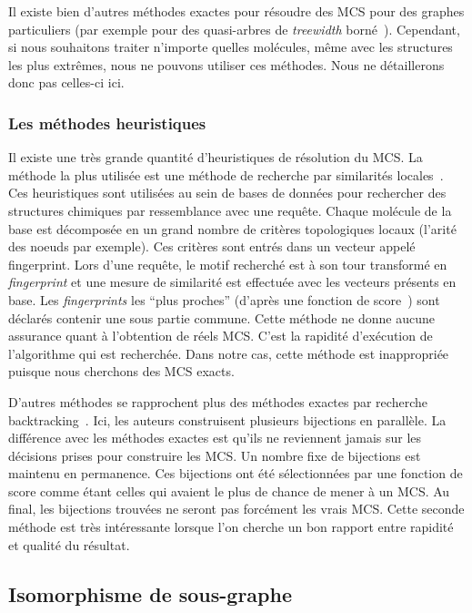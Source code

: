 Il existe bien d'autres méthodes exactes pour résoudre des MCS pour des graphes particuliers (par exemple pour des quasi-arbres de \textit{treewidth} borné~\cite{yamaguchi_finding_2004}).
Cependant, si nous souhaitons traiter n'importe quelles molécules, même avec les structures les plus extrêmes, nous ne pouvons utiliser ces méthodes.
Nous ne détaillerons donc pas celles-ci ici.


\subsubsection{Les méthodes heuristiques}

Il existe une très grande quantité d'heuristiques de résolution du MCS.
La méthode la plus utilisée est une méthode de recherche par similarités locales~\cite{yan_substructure_2005,willett_similarity_2011}.
Ces heuristiques sont utilisées au sein de bases de données pour rechercher des structures chimiques par ressemblance avec une requête.
Chaque molécule de la base est décomposée en un grand nombre de critères topologiques locaux (l'arité des noeuds par exemple).
Ces critères sont entrés dans un vecteur appelé fingerprint.
Lors d'une requête, le motif recherché est à son tour transformé en \textit{fingerprint} et une mesure de similarité est effectuée avec les vecteurs présents en base.
Les \textit{fingerprints} les ``plus proches'' (d'après une fonction de score~\cite{maggiora_molecular_2011,ndiaye_cp_2011}) sont déclarés contenir une sous partie commune.
Cette méthode ne donne aucune assurance quant à l'obtention de réels MCS.
C'est la rapidité d'exécution de l'algorithme qui est recherchée.
Dans notre cas, cette méthode est inappropriée puisque nous cherchons des MCS exacts.

D'autres méthodes se rapprochent plus des méthodes exactes par recherche backtracking~\cite{grosso_simple_2008, wang_fmcsr:_2013}.
Ici, les auteurs construisent plusieurs bijections en parallèle.
La différence avec les méthodes exactes est qu'ils ne reviennent jamais sur les décisions prises pour construire les MCS.
Un nombre fixe de bijections est maintenu en permanence.
Ces bijections ont été sélectionnées par une fonction de score comme étant celles qui avaient le plus de chance de mener à un MCS.
Au final, les bijections trouvées ne seront pas forcément les vrais MCS.
Cette seconde méthode est très intéressante lorsque l'on cherche un bon rapport entre rapidité et qualité du résultat.


\subsection{Isomorphisme de sous-graphe}

